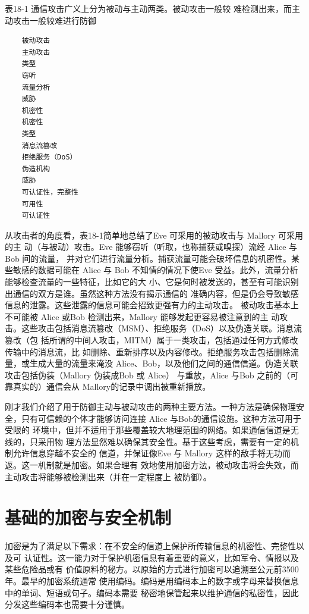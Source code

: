 表18-1 通信攻击广义上分为被动与主动两类。被动攻击一般较
难检测出来，而主动攻击一般较难进行防御
\begin{verbatim}
    被动攻击
    主动攻击
    类型
    窃听
    流量分析
    威胁
    机密性
    机密性
    类型
    消息流篡改
    拒绝服务（DoS）
    伪造机构
    威胁
    可认证性，完整性
    可用性
    可认证性
\end{verbatim}
从攻击者的角度看，表18-1简单地总结了Eve 可采用的被动攻击与 Mallory 可采用的主
动（与被动）攻击。Eve 能够窃听（听取，也称捕获或嗅探）流经 Alice 与Bob 间的流量，
并对它们进行流量分析。捕获流量可能会破坏信息的机密性。某些敏感的数据可能在 Alice
与 Bob 不知情的情况下使Eve 受益。此外，流量分析能够检查流量的一些特征，比如它的大
小、它是何时被发送的，甚至有可能识别出通信的双方是谁。虽然这种方法没有揭示通信的
准确内容，但是仍会导致敏感信息的泄露。这些泄露的信息可能会招致更强有力的主动攻击。
被动攻击基本上不可能被 Alice 或Bob 检测出来，Mallory 能够发起更容易被注意到的主
动攻击。这些攻击包括消息流篡改（MSM）、拒绝服务（DoS）以及伪造关联。消息流篡改（包
括所谓的中间人攻击，MITM）属于一类攻击，包括通过任何方式修改传输中的消息流，比
如删除、重新排序以及内容修改。拒绝服务攻击包括删除流量，或生成大量的流量来淹没
Alice、Bob，以及他们之间的通信信道。伪造关联攻击包括伪装（Mallory 伪装成Bob 或 Alice）
与重放，Alice 与Bob 之前的（可靠真实的）通信会从 Mallory的记录中调出被重新播放。

刚才我们介绍了用于防御主动与被动攻击的两种主要方法。一种方法是确保物理安
全，只有可信赖的个体才能够访问连接 Alice 与Bob的通信设施。这种方法可用于受限的
环境中，但并不适用于那些覆盖较大地理范围的网络。如果通信信道是无线的，只采用物
理方法显然难以确保其安全性。基于这些考虑，需要有一定的机制允许信息穿越不安全的
信道，并保证像Eve 与 Mallory 这样的敌手将无功而返。这一机制就是加密。如果合理有
效地使用加密方法，被动攻击将会失效，而主动攻击将能够被检测出来（并在一定程度上
被防御）。

\section{基础的加密与安全机制}

加密是为了满足以下需求：在不安全的信道上保护所传输信息的机密性、完整性以及可
认证性。这一能力对于保护机密信息有着重要的意义，比如军令、情报以及某些危险品或有
价值原料的秘方。以原始的方式进行加密可以追溯至公元前3500年。最早的加密系统通常
使用编码。编码是用编码本上的数字或字母来替换信息中的单词、短语或句子。编码本需要
秘密地保管起来以维护通信的私密性，因此分发这些编码本也需要十分谨慎。

